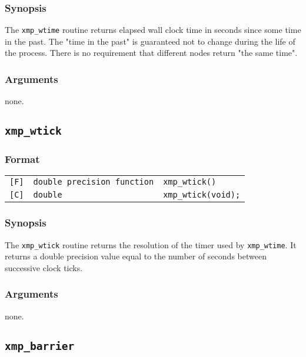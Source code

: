 \subsubsection*{Synopsis}
    The {\tt xmp\_wtime} routine returns elapsed wall clock time in seconds 
    since some time in the past. The "time in the past" is guaranteed not to change
    during the life of the process.
    There is no requirement that different nodes return "the same time".

\subsubsection*{Arguments}
    none.


\vspace{0.3cm}

\subsection{\tt xmp\_wtick}

\subsubsection*{Format}

\begin{tabular}{lll}

\verb![F]!&  {\tt double precision function}& {\tt xmp\_wtick()}\\

\verb![C]!&  {\tt double}& {\tt xmp\_wtick(void);}

\end{tabular}

\subsubsection*{Synopsis}
    The {\tt xmp\_wtick} routine returns the resolution of the timer used by {\tt xmp\_wtime}.
    It returns a double precision value equal to the number of seconds 
    between successive clock ticks.

\subsubsection*{Arguments}
    none.


\vspace{0.3cm}

\subsection{\tt xmp\_barrier}

